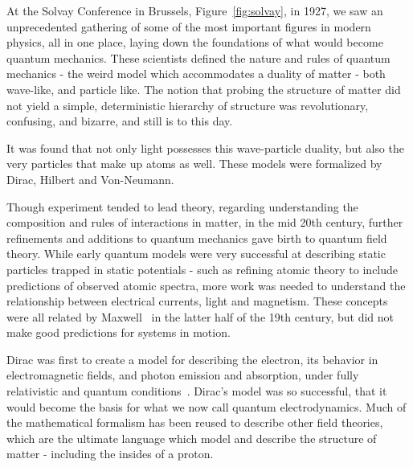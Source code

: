 At the Solvay Conference in Brussels, Figure~\ref{fig:solvay}, in 1927, we saw
an unprecedented gathering of some of the most important figures in modern
physics, all in one place, laying down the foundations of what would become
quantum mechanics. These scientists defined the nature and rules of quantum
mechanics - the weird model which accommodates a duality of matter - both
wave-like, and particle like. The notion that probing the structure of matter
did not yield a simple, deterministic hierarchy of structure was revolutionary,
confusing, and bizarre, and still is to this day.

It was found that not only light possesses this wave-particle duality, but also
the very particles that make up atoms as well. These models were formalized by
Dirac, Hilbert and Von-Neumann.

Though experiment tended to lead theory, regarding understanding the composition
and rules of interactions in matter, in the mid 20th century, further
refinements and additions to quantum mechanics gave birth to quantum field
theory. While early quantum models were very successful at describing static
particles trapped in static potentials - such as refining atomic theory to
include predictions of observed atomic spectra, more work was needed to
understand the relationship between electrical currents, light and magnetism.
These concepts were all related by Maxwell~\cite{Maxwell1865} in the latter half
of the 19th century, but did not make good predictions for systems in motion.

Dirac was first to create a model for describing the electron, its behavior in
electromagnetic fields, and photon emission and absorption, under fully
relativistic and quantum conditions~\cite{Dirac}. Dirac's model was so
successful, that it would become the basis for what we now call quantum
electrodynamics. Much of the mathematical formalism has been reused to describe
other field theories, which are the ultimate language which model and describe
the structure of matter - including the insides of a proton. 

